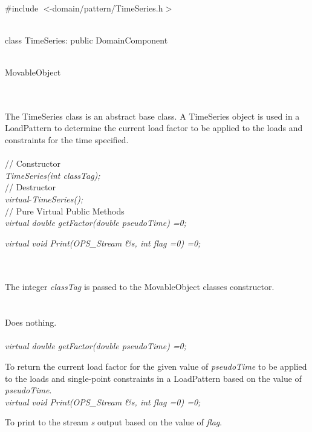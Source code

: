
   \\
\#include $<\tilde{ }$domain/pattern/TimeSeries.h$>$  


  \\
class TimeSeries: public DomainComponent  


 \\
MovableObject 

\indent{} \\

 \\ 
\indent The TimeSeries class is an abstract base class. A
TimeSeries object is used in a LoadPattern to determine the current
load factor to be applied to the loads and constraints for the time
specified. \\ 

 \\
\indent // Constructor \\ 
{\em TimeSeries(int classTag);}\\ 

\indent // Destructor \\ 
{\em virtual $\tilde{ }$TimeSeries();}\\  

\indent // Pure Virtual Public Methods \\ 
{\em  virtual double getFactor(double pseudoTime) =0;}

{\em  virtual void Print(OPS_Stream \&s, int flag =0) =0;}


 \\ 
\\ 
The integer {\em classTag} is passed to the MovableObject classes
constructor. \\

 \\
\\ 
Does nothing. \\

 \\
{\em  virtual double getFactor(double pseudoTime) =0;}

To return the current load factor for the given value of {\em
pseudoTime} to be applied to the loads and single-point constraints in
a LoadPattern based on the value of {\em pseudoTime}. \\

{\em  virtual void Print(OPS_Stream \&s, int flag =0) =0;}

To print to the stream {\em s} output based on the value of {\em flag}.